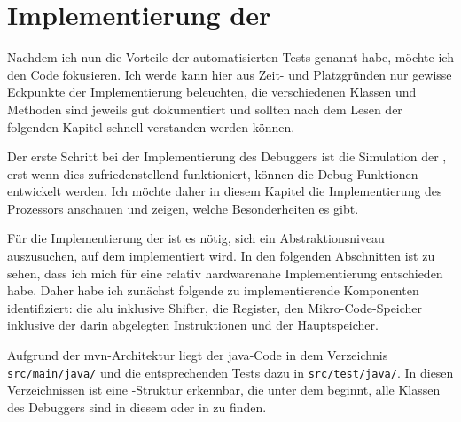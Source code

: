 \chapter{Implementierung der \mic}
Nachdem ich nun die Vorteile der automatisierten Tests genannt habe, möchte ich den Code fokusieren. Ich werde kann hier aus Zeit- und Platzgründen nur gewisse Eckpunkte der Implementierung beleuchten, die verschiedenen Klassen und Methoden sind jeweils gut dokumentiert und sollten nach dem Lesen der folgenden Kapitel schnell verstanden werden können.

Der erste Schritt bei der Implementierung des Debuggers ist die Simulation der \mic, erst wenn dies zufriedenstellend funktioniert, können die Debug-Funktionen entwickelt werden. Ich möchte daher in diesem Kapitel die Implementierung des Prozessors anschauen und zeigen, welche Besonderheiten es gibt.

Für die Implementierung der \mic ist es nötig, sich ein Abstraktionsniveau auszusuchen, auf dem implementiert wird. In den folgenden Abschnitten ist zu sehen, dass ich mich für eine relativ hardwarenahe Implementierung entschieden habe. Daher habe ich zunächst folgende zu implementierende Komponenten identifiziert: die \gls{alu} inklusive Shifter, die Register, den Mikro-Code-Speicher inklusive der darin abgelegten Instruktionen und der Hauptspeicher.

Aufgrund der \gls{mvn}-Architektur liegt der \gls{java}-Code in dem Verzeichnis \texttt{src/main/java/} und die entsprechenden Tests dazu in \texttt{src/test/java/}. In diesen Verzeichnissen ist eine \package-Struktur erkennbar, die unter dem \package {} beginnt, alle Klassen des Debuggers sind in diesem \package oder in \subpackages zu finden.

